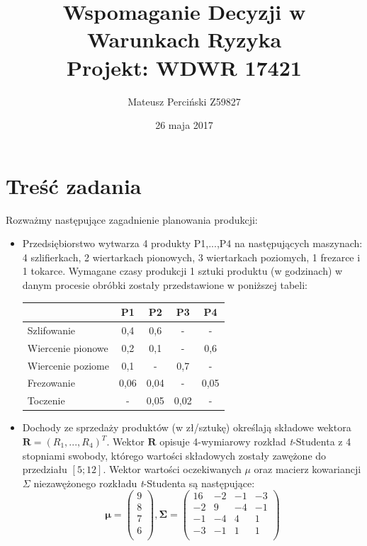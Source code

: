 \documentclass[11pt,a4paper]{article}
\title{Wspomaganie Decyzji w Warunkach Ryzyka\\\large \medskip Projekt: WDWR 17421\\}
\author{Mateusz Perciński Z59827}
\date{26 maja 2017}
\begin{document}
\maketitle

\section*{Treść zadania}
Rozważmy następujące zagadnienie planowania produkcji:

\begin{itemize}
  \item Przedsiębiorstwo wytwarza 4 produkty P1,...,P4 na następujących maszynach: 4 szlifierkach, 2 wiertarkach pionowych, 3 wiertarkach poziomych, 1 frezarce i 1 tokarce. Wymagane czasy produkcji 1 sztuki produktu (w godzinach) w danym procesie obróbki zostały przedstawione w poniższej tabeli:\\
  \begin{center}
  \begin{tabular}{l*{4}{c}}
  	\hline
              			& P1 & P2 & P3 & P4 \\
	\hline
	Szlifowanie 		& 0,4 & 0,6 & - & - \\
	Wiercenie pionowe   & 0,2 & 0,1 & - & 0,6 \\
	Wiercenie poziome 	& 0,1 & - & 0,7 & -  \\
	Frezowanie  	 	& 0,06 & 0,04 & - & 0,05 \\
	Toczenie	     	& - & 0,05 & 0,02 & - \\
	\hline
	\end{tabular}
	\end{center}

  \item Dochody ze sprzedaży produktów (w zł/sztukę) określają składowe wektora $\mathbf{R} = (R_{1},...,R_{4})^{T}$. Wektor $\mathbf{R}$ opisuje 4-wymiarowy rozkład \textit{t}-Studenta z 4 stopniami swobody, którego wartości składowych zostały zawężone do przedziału $[5;12]$. Wektor wartości oczekiwanych $\mu$ oraz macierz kowariancji $\Sigma$ niezawężonego rozkładu \textit{t}-Studenta są następujące:
  \begin{displaymath}
\mathbf{\mu} = 
 \begin{pmatrix}
  9 \\ 8 \\ 7 \\ 6 \\  
 \end{pmatrix},
 \mathbf{\Sigma} = 
 \begin{pmatrix}
  16 & -2 & -1 & -3 \\
  -2 & 9 & -4 & -1 \\ 
  -1 & -4 & 4 & 1 \\
  -3 & -1 & 1 & 1 \\  
 \end{pmatrix}
  \end{displaymath}
  

\end{itemize}
\end{document}
